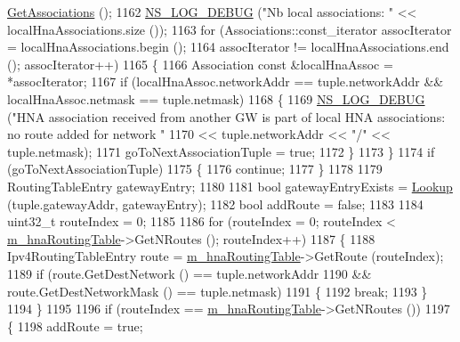 \begin{DoxyCode}
      \hyperlink{classns3_1_1olsr_1_1OlsrState_af0d7450ccc6238bb018e8f22fcaf0552}{GetAssociations} ();
1162       \hyperlink{group__logging_ga413f1886406d49f59a6a0a89b77b4d0a}{NS\_LOG\_DEBUG} (\textcolor{stringliteral}{"Nb local associations: "} << localHnaAssociations.size ());
1163       \textcolor{keywordflow}{for} (Associations::const\_iterator assocIterator = localHnaAssociations.begin ();
1164            assocIterator != localHnaAssociations.end (); assocIterator++)
1165         \{
1166           Association \textcolor{keyword}{const} &localHnaAssoc = *assocIterator;
1167           \textcolor{keywordflow}{if} (localHnaAssoc.networkAddr == tuple.networkAddr && localHnaAssoc.netmask == tuple.netmask)
1168             \{
1169               \hyperlink{group__logging_ga413f1886406d49f59a6a0a89b77b4d0a}{NS\_LOG\_DEBUG} (\textcolor{stringliteral}{"HNA association received from another GW is part of local HNA
       associations: no route added for network "}
1170                             << tuple.networkAddr << \textcolor{stringliteral}{"/"} << tuple.netmask);
1171               goToNextAssociationTuple = \textcolor{keyword}{true};
1172             \}
1173         \}
1174       \textcolor{keywordflow}{if} (goToNextAssociationTuple)
1175         \{
1176           \textcolor{keywordflow}{continue};
1177         \}
1178 
1179       RoutingTableEntry gatewayEntry;
1180 
1181       \textcolor{keywordtype}{bool} gatewayEntryExists = \hyperlink{classns3_1_1olsr_1_1RoutingProtocol_a514bf401454b233af509476fc3fd5d6b}{Lookup} (tuple.gatewayAddr, gatewayEntry);
1182       \textcolor{keywordtype}{bool} addRoute = \textcolor{keyword}{false};
1183 
1184       uint32\_t routeIndex = 0;
1185 
1186       \textcolor{keywordflow}{for} (routeIndex = 0; routeIndex < \hyperlink{classns3_1_1olsr_1_1RoutingProtocol_a398799911ae136e0b247b4bbd608c336}{m\_hnaRoutingTable}->GetNRoutes (); routeIndex++)
1187         \{
1188           Ipv4RoutingTableEntry route = \hyperlink{classns3_1_1olsr_1_1RoutingProtocol_a398799911ae136e0b247b4bbd608c336}{m\_hnaRoutingTable}->GetRoute (routeIndex);
1189           \textcolor{keywordflow}{if} (route.GetDestNetwork () == tuple.networkAddr
1190               && route.GetDestNetworkMask () == tuple.netmask)
1191             \{
1192               \textcolor{keywordflow}{break};
1193             \}
1194         \}
1195 
1196       \textcolor{keywordflow}{if} (routeIndex == \hyperlink{classns3_1_1olsr_1_1RoutingProtocol_a398799911ae136e0b247b4bbd608c336}{m\_hnaRoutingTable}->GetNRoutes ())
1197         \{
1198           addRoute = \textcolor{keyword}{true};

\end{DoxyCode}
